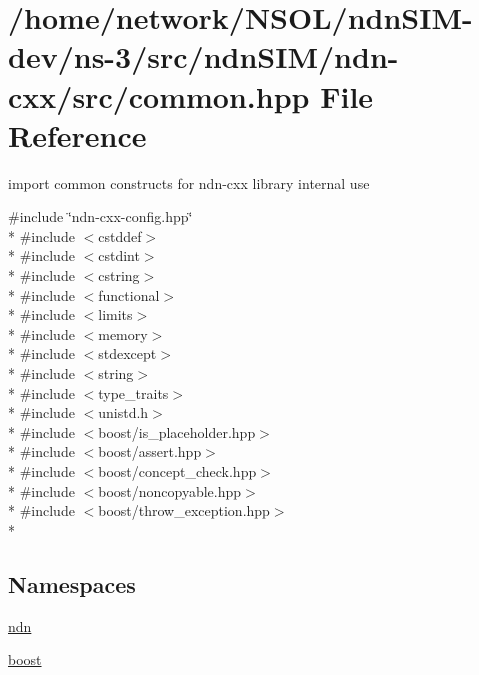 \hypertarget{ndn-cxx_2src_2common_8hpp}{}\section{/home/network/\+N\+S\+O\+L/ndn\+S\+I\+M-\/dev/ns-\/3/src/ndn\+S\+I\+M/ndn-\/cxx/src/common.hpp File Reference}
\label{ndn-cxx_2src_2common_8hpp}


import common constructs for ndn-\/cxx library internal use  


{\ttfamily \#include \char`\"{}ndn-\/cxx-\/config.\+hpp\char`\"{}}\\*
{\ttfamily \#include $<$cstddef$>$}\\*
{\ttfamily \#include $<$cstdint$>$}\\*
{\ttfamily \#include $<$cstring$>$}\\*
{\ttfamily \#include $<$functional$>$}\\*
{\ttfamily \#include $<$limits$>$}\\*
{\ttfamily \#include $<$memory$>$}\\*
{\ttfamily \#include $<$stdexcept$>$}\\*
{\ttfamily \#include $<$string$>$}\\*
{\ttfamily \#include $<$type\+\_\+traits$>$}\\*
{\ttfamily \#include $<$unistd.\+h$>$}\\*
{\ttfamily \#include $<$boost/is\+\_\+placeholder.\+hpp$>$}\\*
{\ttfamily \#include $<$boost/assert.\+hpp$>$}\\*
{\ttfamily \#include $<$boost/concept\+\_\+check.\+hpp$>$}\\*
{\ttfamily \#include $<$boost/noncopyable.\+hpp$>$}\\*
{\ttfamily \#include $<$boost/throw\+\_\+exception.\+hpp$>$}\\*
\subsection*{Namespaces}
\begin{DoxyCompactItemize}
\item 
 \hyperlink{namespacendn}{ndn}
\item 
 \hyperlink{namespaceboost}{boost}
\end{DoxyCompactItemize}
